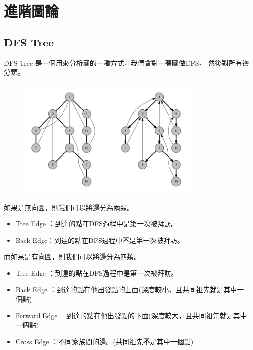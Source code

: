 \section{進階圖論}
    \subsection{DFS Tree}
    DFS Tree 是一個用來分析圖的一種方式，我們會對一張圖做DFS，
    然後對所有邊分類。

    \begin{figure}[!htbp]
        \centering
        \includegraphics[width=0.8\textwidth]{../Images/AT1.png}
    \end{figure}

    如果是無向圖，則我們可以將邊分為兩類。

    \begin{itemize}
        \item Tree Edge ：到達的點在DFS過程中是第一次被拜訪。
        \item Back Edge：到達的點在DFS過程中\textbf{不}是第一次被拜訪。
    \end{itemize}

    而如果是有向圖，則我們可以將邊分為四類。

    \begin{itemize}
        \item Tree Edge ：到達的點在DFS過程中是第一次被拜訪。
        \item Back Edge ：到達的點在他出發點的上面(深度較小，且共同祖先就是其中一個點)
        \item Forward Edge ：到達的點在他出發點的下面(深度較大，且共同祖先就是其中一個點)
        \item Cross Edge ：不同家族間的邊。(共同祖先\textbf{不}是其中一個點)
    \end{itemize}

